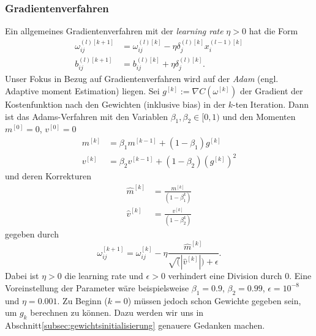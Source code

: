\subsubsection{Gradientenverfahren}
Ein allgemeines Gradientenverfahren mit der \textit{learning rate} $\eta > 0$ hat die Form
\begin{align*}
    \omega_{ij}^{(l)[k+1]} &= \omega_{ij}^{(l)[k]} - \eta \delta_{j}^{(l)[k]} x_i^{(l-1)[k]}\\
    b_{ij}^{(l)[k+1]} &= b_{ij}^{(l)[k]} + \eta \delta_{j}^{(l)[k]}.
\end{align*}
Unser Fokus in Bezug auf Gradientenverfahren wird auf der \textit{Adam} (engl. Adaptive moment Estimation) liegen. Sei
$g^{[k]} := \nabla C(\omega^{[k]})$ der Gradient der Kostenfunktion nach den Gewichten (inklusive bias) in der $k$-ten
Iteration. Dann ist das Adams-Verfahren mit den Variablen $\beta_1,\beta_2 \in [0,1)$ und den Momenten $m^{[0]}=0$,
$v^{[0]}=0$
\begin{align*}
    m^{[k]} &= \beta_1 m^{[k-1]} + (1-\beta_1)g^[k] \\
    v^{[k]} &= \beta_2 v^{[k-1]} + (1-\beta_2)(g^{[k]})^2
\end{align*}
und deren Korrekturen
\begin{align*}
    \hat{m}^{[k]} &= \frac{m^{[k]}}{(1-\beta_1^k)} \\
    \hat{v}^{[k]} &= \frac{v^{[k]}}{(1-\beta_2^k)}
\end{align*}
gegeben durch
\[
    \omega_{ij}^{[k+1]}= \omega_{ij}^{[k]} - \eta \frac{\hat{m}^{[k]}}{\sqrt(|\hat{v}^{[k]}|) + \epsilon}.
\]
Dabei ist $\eta > 0$ die learning rate und $\epsilon > 0$ verhindert eine Division durch $0$. Eine Voreinstellung der Parameter
wäre beispielsweise $\beta_1=0.9$, $\beta_2=0.99$, $\epsilon=10^{-8}$ und $\eta = 0.001$. Zu Beginn ($k=0$) müssen jedoch schon Gewichte
gegeben sein, um $g_k$ berechnen zu können. Dazu werden wir uns in Abschnitt\eqref{subsec:gewichtsinitialisierung}
genauere Gedanken machen.\\

